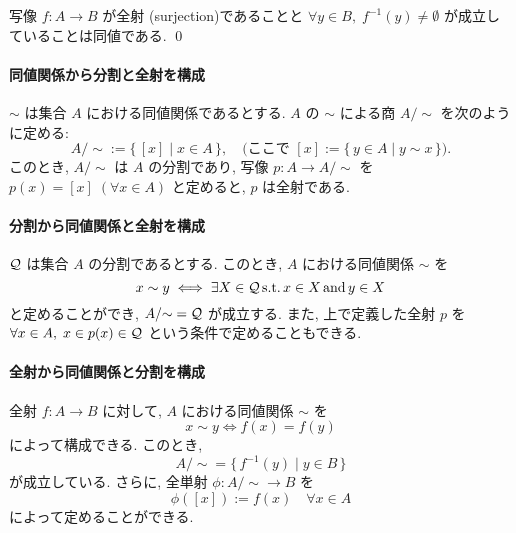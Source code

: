\documentclass[12pt,twoside]{jarticle}
\def\suchthat{\mathop{\text{\rm s.t.}}}
\def\AND{\mathop{\text{\rm and}}}
\begin{document}
\begin{Proposition}[全射]
  写像 $f:A\to B$ が全射 (surjection)であることと %
  $\forall y\in B,\; f^{-1}(y)\ne\emptyset$ が成立していることは同値である.
  \qed
\end{Proposition}

\paragraph{同値関係から分割と全射を構成}

$\sim$ は集合 $A$ における同値関係であるとする.
$A$ の $\sim$ による商 $A/{\sim}$ を次のように定める:
\begin{equation*}
  A/{\sim} := \{\, [x] \mid x\in A \,\},
  \quad\text{(ここで $[x]:=\{\,y\in A\mid y\sim x\,\}$)}.
\end{equation*}
このとき, $A/{\sim}$ は $A$ の分割であり, 
写像 $p:A\to A/{\sim}$ を $p(x)=[x]\;(\forall x\in A)$ と定めると, 
$p$ は全射である.

\paragraph{分割から同値関係と全射を構成}

$\cal Q$ は集合 $A$ の分割であるとする.
このとき, $A$ における同値関係 $\sim$ を
\begin{equation*}
  x \sim y \iff \exists X\in{\cal Q} \suchthat x\in X \AND y\in X
\end{equation*}
と定めることができ, $A/{\sim} = {\cal Q}$ が成立する.
また, 上で定義した全射 $p$ を $\forall x\in A,\; x\in p(x)\in {\cal Q}$ %
という条件で定めることもできる.

\paragraph{全射から同値関係と分割を構成}

全射 $f:A\to B$ に対して, $A$ における同値関係 $\sim$ を
\begin{equation*}
  x \sim y \iff f(x) = f(y)
\end{equation*}
によって構成できる. このとき,
\begin{equation*}
  A/{\sim} = \{\, f^{-1}(y) \mid y \in B \,\}
\end{equation*}
が成立している. さらに, 全単射 $\phi:A/{\sim}\to B$ を
\begin{equation*}
  \phi([x]) := f(x)\quad\forall x \in A
\end{equation*}
によって定めることができる.
\end{document}
